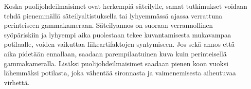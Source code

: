 Koska puolijohdeilmaisimet ovat herkempiä säteilylle, samat tutkimukset voidaan tehdä pienemmällä säteilyaltistuksella tai lyhyemmässä ajassa verrattuna perinteiseen gammakameraan\cite{knoll_radiation_2010}. Säteilyannos on suoraan verrannollinen syöpäriskiin ja lyhyempi aika puolestaan tekee kuvantamisesta mukavampaa potilaalle, voiden vaikuttaa liikeartifaktojen syntymiseen. Jos sekä annos että aika pidetään ennallaan, saadaan parempilaatuinen kuva kuin perinteisellä gammakameralla.\cite{taillefer_scintillation_2022} Lisäksi puolijohdeilmaisimet saadaan pienen koon vuoksi lähemmäksi potilasta, joka vähentää sironnasta ja vaimenemisesta aiheutuvaa virhettä\cite{knoll_radiation_2010, taillefer_scintillation_2022}.